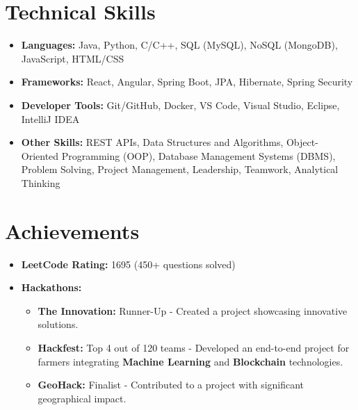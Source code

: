 \documentclass[11pt,a4paper,sans]{moderncv}        %
\begin{document}
\section{Technical Skills}
\vspace{1pt}
\begin{itemize}
    \item \textbf{Languages:} Java, Python, C/C++, SQL (MySQL), NoSQL (MongoDB), JavaScript, HTML/CSS
    \item \textbf{Frameworks:} React, Angular, Spring Boot, JPA, Hibernate, Spring Security
    \item \textbf{Developer Tools:} Git/GitHub, Docker, VS Code, Visual Studio, Eclipse, IntelliJ IDEA
    \item \textbf{Other Skills:} REST APIs, Data Structures and Algorithms, Object-Oriented Programming (OOP), Database Management Systems (DBMS), Problem Solving, Project Management, Leadership, Teamwork, Analytical Thinking
\end{itemize}
\section{Achievements}

\begin{itemize}
    \item \textbf{LeetCode Rating:} 1695 (450+ questions solved)
    \item \textbf{Hackathons:}
        \begin{itemize}

            \item \textbf{The Innovation:} Runner-Up - Created a project showcasing innovative solutions.
            \item \textbf{Hackfest:} Top 4 out of 120 teams - Developed an end-to-end project for farmers integrating \textbf{Machine Learning} and \textbf{Blockchain} technologies.
            \item \textbf{GeoHack:} Finalist - Contributed to a project with significant geographical impact.
        \end{itemize}
\end{itemize}



\nocite{*}

\end{document}
